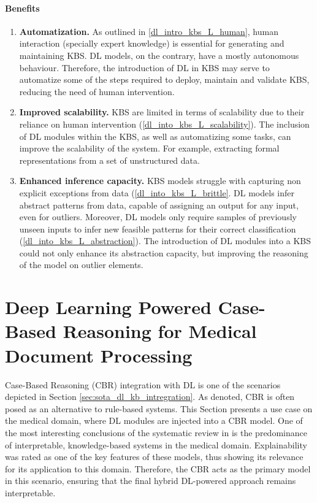 \paragraph{Benefits}
\begin{enumerate} [start=1,label={\bfseries B\arabic*.}]
    \item \textbf{Automatization.}\label{dlintrokbs_B_automatization} As outlined in \ref{dl_intro_kbs_L_human}, human interaction (specially expert knowledge) is essential for generating and maintaining KBS. DL models, on the contrary, have a mostly autonomous behaviour. Therefore, the introduction of DL in KBS may serve to automatize some of the steps required to deploy, maintain and validate KBS, reducing the need of human intervention.
    
    \item \textbf{Improved scalability.}\label{dlintrokbs_B_scalability} KBS are limited in terms of scalability due to their reliance on human intervention (\ref{dl_into_kbs_L_scalability}). The inclusion of DL modules within the KBS, as well as automatizing some tasks, can improve the scalability of the system. For example, extracting formal representations from a set of unstructured data.
    
    \item \textbf{Enhanced inference capacity.}\label{dlintrokbs_B_inference} KBS models struggle with capturing non explicit exceptions from data (\ref{dl_into_kbs_L_brittle}. DL models infer abstract patterns from data, capable of assigning an output for any input, even for outliers. Moreover, DL models only require samples of previously unseen inputs to infer new feasible patterns for their correct classification (\ref{dl_into_kbs_L_abstraction}). The introduction of DL modules into a KBS could not only enhance its abstraction capacity, but improving the reasoning of the model on outlier elements.

\end{enumerate}


\section{Deep Learning Powered Case-Based Reasoning for Medical Document Processing}\label{5_sec:dl_powered_kbs_medical}
Case-Based Reasoning (CBR) integration with DL is one of the scenarios depicted in Section \ref{sec:sota_dl_kb_intregration}. As denoted, CBR is often posed as an alternative to rule-based systems. This Section presents a use case on the medical domain, where DL modules are injected into a CBR model. One of the most interesting conclusions of the systematic review in \cite{amador_systematic_review_2019} is the predominance of interpretable, knowledge-based systems in the medical domain. Explainability was rated as one of the key features of these models, thus showing its relevance for its application to this domain. Therefore, the CBR acts as the primary model in this scenario, ensuring that the final hybrid DL-powered approach remains interpretable. 

